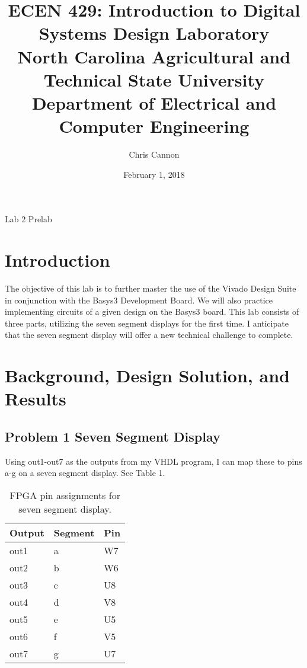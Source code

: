\documentclass[11pt]{article}
\title {ECEN 429: Introduction to Digital Systems Design Laboratory \\ North Carolina Agricultural and Technical State University \\ Department of Electrical and Computer Engineering} %
\author{Chris Cannon} %
\date{February 1, 2018}
\begin{document}
	
\maketitle

\begin{center}
	Lab 2 Prelab
\end{center}

\pagebreak

\section{Introduction}

The objective of this lab is to further master the use of the Vivado Design Suite in conjunction with the Basys3 Development Board. We will also practice implementing circuits of a given design on the Basys3 board. This lab consists of three parts, utilizing the seven segment displays for the first time. I anticipate that the seven segment display will offer a new technical challenge to complete.

\section{Background, Design Solution, and Results}

\subsection{Problem 1 Seven Segment Display}

Using out1-out7 as the outputs from my VHDL program, I can map these to pins a-g on a seven segment display. See Table 1.

\begin{table}[h]
\begin{center}
	\begin{tabular}{| l | l | l |}
		\hline	
		Output & Segment & Pin \\ \hline
		out1 & a & W7 \\ \hline
		out2 & b & W6 \\ \hline
		out3 & c & U8 \\ \hline
		out4 & d & V8 \\ \hline
		out5 & e & U5 \\ \hline
		out6 & f & V5 \\ \hline
		out7 & g & U7 \\ \hline
	\end{tabular}
	\caption{\label{tab:table-name}FPGA pin assignments for seven segment display.}
\end{center}	
\end{table}
\end{document}
